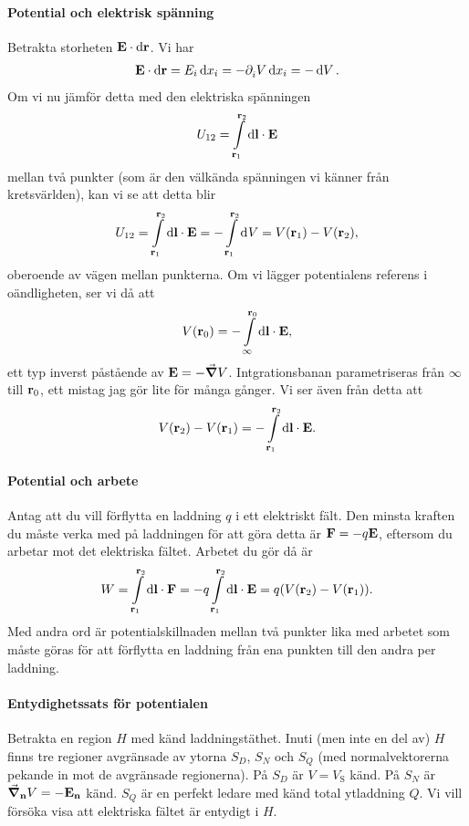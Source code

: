 \paragraph{Potential och elektrisk spänning}
Betrakta storheten $\vb{E}\cdot\dd{\vb{r}}$. Vi har
\begin{align*}
	\vb{E}\cdot\dd{\vb{r}} = E_{i}\dd{x_{i}} = -\partial_{i}^{}V\dd{x_{i}} = -\dd{V}.
\end{align*}
Om vi nu jämför detta med den elektriska spänningen
\begin{align*}
	U_{12} = \int\limits_{\vb{r}_{1}}^{\vb{r}_{2}}\dd{\vb{l}}\cdot \vb{E}
\end{align*}
mellan två punkter (som är den välkända spänningen vi känner från kretsvärlden), kan vi se att detta blir
\begin{align*}
	U_{12} = \int\limits_{\vb{r}_{1}}^{\vb{r}_{2}}\dd{\vb{l}}\cdot \vb{E} = -\int\limits_{\vb{r}_{1}}^{\vb{r}_{2}}\dd[]{V} = V(\vb{r}_{1}) - V(\vb{r}_{2}),
\end{align*}
oberoende av vägen mellan punkterna. Om vi lägger potentialens referens i oändligheten, ser vi då att
\begin{align*}
	V(\vb{r}_{0}) = -\int\limits_{\infty}^{\vb{r}_{0}}\dd{\vb{l}}\cdot \vb{E},
\end{align*}
ett typ inverst påstående av $\vb{E} = -\grad{V}$. Intgrationsbanan parametriseras från $\infty$ till $\vb{r}_{0}$, ett mistag jag gör lite för många gånger. Vi ser även från detta att
\begin{align*}
	V(\vb{r}_{2}) - V(\vb{r}_{1}) = -\int\limits_{\vb{r}_{1}}^{\vb{r}_{2}}\dd{\vb{l}}\cdot \vb{E}.
\end{align*}

\paragraph{Potential och arbete}
Antag att du vill förflytta en laddning $q$ i ett elektriskt fält. Den minsta kraften du måste verka med på laddningen för att göra detta är $\vb{F} = -q\vb{E}$, eftersom du arbetar mot det elektriska fältet. Arbetet du gör då är
\begin{align*}
	W = \int\limits_{\vb{r}_{1}}^{\vb{r}_{2}}\dd{\vb{l}}\cdot \vb{F} = -q\int\limits_{\vb{r}_{1}}^{\vb{r}_{2}}\dd{\vb{l}}\cdot \vb{E} = q(V(\vb{r}_{2}) - V(\vb{r}_{1})).
\end{align*}
Med andra ord är potentialskillnaden mellan två punkter lika med arbetet som måste göras för att förflytta en laddning från ena punkten till den andra per laddning.

\paragraph{Entydighetssats för potentialen}
Betrakta en region $H$ med känd laddningstäthet. Inuti (men inte en del av) $H$ finns tre regioner avgränsade av ytorna $S_{D}$, $S_{N}$ och $S_{Q}$ (med normalvektorerna pekande in mot de avgränsade regionerna). På $S_{D}$ är $V = V_{\text{S}}$ känd. På $S_{N}$ är $\grad_{\vb{n}}{V} = -\vb{E}_{\vb{n}}$ känd. $S_{Q}$ är en perfekt ledare med känd total ytladdning $Q$. Vi vill försöka visa att elektriska fältet är entydigt i $H$.

